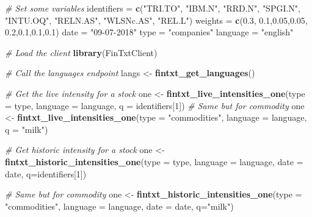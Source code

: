 \documentclass[]{book}
\newenvironment{Shaded}{\begin{snugshade}}{\end{snugshade}}
\newcommand{\KeywordTok}[1]{\textcolor[rgb]{0.13,0.29,0.53}{\textbf{#1}}}
\newcommand{\DataTypeTok}[1]{\textcolor[rgb]{0.13,0.29,0.53}{#1}}
\newcommand{\DecValTok}[1]{\textcolor[rgb]{0.00,0.00,0.81}{#1}}
\newcommand{\FloatTok}[1]{\textcolor[rgb]{0.00,0.00,0.81}{#1}}
\newcommand{\StringTok}[1]{\textcolor[rgb]{0.31,0.60,0.02}{#1}}
\newcommand{\CommentTok}[1]{\textcolor[rgb]{0.56,0.35,0.01}{\textit{#1}}}
\newcommand{\NormalTok}[1]{#1}
\theoremstyle{definition}
\theoremstyle{definition}
\theoremstyle{definition}
\theoremstyle{remark}
\begin{document}
\begin{Shaded}
\begin{Highlighting}[]
\CommentTok{# Set some variables}
\NormalTok{identifiers =}\StringTok{ }\KeywordTok{c}\NormalTok{(}\StringTok{"TRI.TO"}\NormalTok{, }\StringTok{"IBM.N"}\NormalTok{, }\StringTok{"RRD.N"}\NormalTok{, }\StringTok{"SPGI.N"}\NormalTok{, }\StringTok{"INTU.OQ"}\NormalTok{, }\StringTok{"RELN.AS"}\NormalTok{, }\StringTok{"WLSNc.AS"}\NormalTok{, }\StringTok{"REL.L"}\NormalTok{)}
\NormalTok{weights =}\StringTok{ }\KeywordTok{c}\NormalTok{(}\FloatTok{0.3}\NormalTok{, }\FloatTok{0.1}\NormalTok{,}\FloatTok{0.05}\NormalTok{,}\FloatTok{0.05}\NormalTok{, }\FloatTok{0.2}\NormalTok{,}\FloatTok{0.1}\NormalTok{,}\FloatTok{0.1}\NormalTok{,}\FloatTok{0.1}\NormalTok{)}
\NormalTok{date =}\StringTok{ "09-07-2018"}
\NormalTok{type =}\StringTok{ "companies"}
\NormalTok{language =}\StringTok{ "english"}

\CommentTok{# Load the client}
\KeywordTok{library}\NormalTok{(FinTxtClient)}

\CommentTok{# Call the languages endpoint}
\NormalTok{langs <-}\StringTok{ }\KeywordTok{fintxt_get_languages}\NormalTok{()}

\CommentTok{# Get the live intensity for a stock}
\NormalTok{one <-}\StringTok{ }\KeywordTok{fintxt_live_intensities_one}\NormalTok{(}\DataTypeTok{type =}\NormalTok{ type, }\DataTypeTok{language =}\NormalTok{ language, }\DataTypeTok{q =}\NormalTok{ identifiers[}\DecValTok{1}\NormalTok{])}
\CommentTok{# Same but for commodity}
\NormalTok{one <-}\StringTok{ }\KeywordTok{fintxt_live_intensities_one}\NormalTok{(}\DataTypeTok{type =} \StringTok{"commodities"}\NormalTok{, }\DataTypeTok{language =}\NormalTok{ language, }\DataTypeTok{q =} \StringTok{"milk"}\NormalTok{)}

\CommentTok{# Get historic intensity for a stock}
\NormalTok{one <-}\StringTok{ }\KeywordTok{fintxt_historic_intensities_one}\NormalTok{(}\DataTypeTok{type =}\NormalTok{ type, }\DataTypeTok{language =}\NormalTok{ language,}
                                       \DataTypeTok{date =}\NormalTok{ date, }\DataTypeTok{q=}\NormalTok{identifiers[}\DecValTok{1}\NormalTok{])}
                                       
\CommentTok{# Same but for commodity}
\NormalTok{one <-}\StringTok{ }\KeywordTok{fintxt_historic_intensities_one}\NormalTok{(}\DataTypeTok{type =} \StringTok{"commodities"}\NormalTok{, }\DataTypeTok{language =}\NormalTok{ language,}
                                       \DataTypeTok{date =}\NormalTok{ date, }\DataTypeTok{q=}\StringTok{"milk"}\NormalTok{)}


\end{Highlighting}
\end{Shaded}
\end{document}
